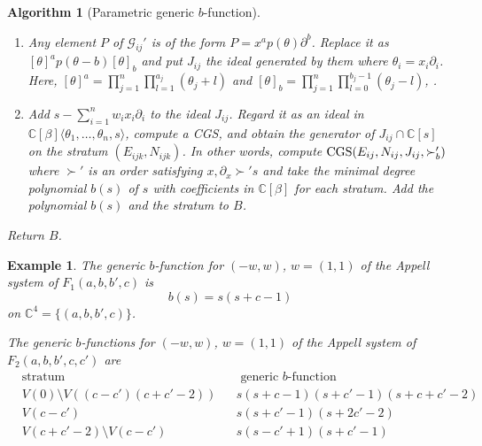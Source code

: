 \documentclass{article}
\def\CC{\mathbb{C}}
\def\p{\partial}
\def\pd#1{\partial_{#1}}
\def\CGS{{\rm CGS}}
\newtheorem{example}{Example}
\newtheorem{algorithm}{Algorithm}
\begin{document}
\begin{algorithm}[Parametric generic $b$-function]
\begin{enumerate}
\begin{enumerate}
		\begin{enumerate}
		\item[4.1] 
		Any element $P$ of $\mathcal{G}_{ij}'$ is of the form $P = x^a p(\theta) \p^b$.
		 Replace it as $[\theta]^a p(\theta - b) [\theta]_b$ and put $J_{ij}$ the ideal generated by them where $\theta_i = x_i \pd{i}$.
 Here, $[\theta]^a=\prod_{j=1}^n \prod_{l=1}^{a_{j}} (\theta_j+l)$
and  $[\theta]_b=\prod_{j=1}^n \prod_{l=0}^{b_{j}-1} (\theta_j-l)$,
\cite[p.45, p.195]{SST}.
		\item[4.2] 
		Add $s - \sum_{i=1}^n w_i x_i \p_i$ to the ideal $J_{ij}$.
                Regard it as an ideal in 
		$\CC[\beta]\langle \theta_1, \ldots, \theta_n, s \rangle$,
                compute a CGS, 
                and obtain the generator of 
                $J_{ij} \cap \mathbb{C}[s]$ on the
		stratum $(E_{ijk}, N_{ijk})$.
		In other words, compute $\CGS(E_{ij}, N_{ij}, J_{ij}, \succ'_b)$ where  $\succ'$
is an order satisfying $x, \pd{x} \succ' s$
               and take the minimal degree polynomial $b(s)$ of $s$ with coefficients
               in $\CC[\beta]$ for each stratum. 
               Add the polynomial $b(s)$ and the stratum to $B$.
		\end{enumerate}
	\end{enumerate}
Return $B$.
\end{enumerate}
\end{algorithm}

\begin{example} \rm  \label{ex:f1-f2-comprehensive-b-fn}
The generic $b$-function for $(-w,w)$, $w=(1,1)$
of the Appell system of $F_1(a,b,b',c)$ 
is
$$
b(s) = s(s+c-1)
$$
on $\CC^4=\{(a,b,b',c)\}$.

The generic $b$-functions for $(-w,w)$, $w=(1,1)$
of the Appell system of $F_2(a,b,b',c,c')$ are
\begin{align*}
& \mbox{stratum} & & \mbox{ generic $b$-function} \\
& V(0) \setminus V((c-c')(c+c'-2)) & &  s(s+c-1)(s+c'-1)(s+c+c'-2) \\
& V(c-c') & & s(s+c'-1)(s+2c'-2) \\
& V(c+c'-2) \setminus V(c-c') & & s(s-c'+1)(s+c'-1) 
\end{align*}
\end{example}
\end{document}
